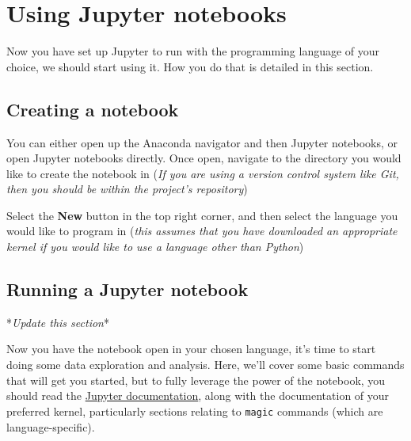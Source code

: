 \documentclass[]{book}
\begin{document}
\hypertarget{using-jupyter-notebooks}{%
\section{Using Jupyter notebooks}\label{using-jupyter-notebooks}}

Now you have set up Jupyter to run with the programming language of your choice, we should start using it. How you do that is detailed in this section.

\hypertarget{creating-a-notebook}{%
\subsection{Creating a notebook}\label{creating-a-notebook}}

You can either open up the Anaconda navigator and then Jupyter notebooks, or open Jupyter notebooks directly. Once open, navigate to the directory you would like to create the notebook in (\emph{If you are using a version control system like Git, then you should be within the project's repository})

Select the \textbf{New} button in the top right corner, and then select the language you would like to program in (\emph{this assumes that you have downloaded an appropriate kernel if you would like to use a language other than Python})

\hypertarget{running-a-jupyter-notebook}{%
\subsection{Running a Jupyter notebook}\label{running-a-jupyter-notebook}}

*\emph{Update this section}*

Now you have the notebook open in your chosen language, it's time to start doing some data exploration and analysis. Here, we'll cover some basic commands that will get you started, but to fully leverage the power of the notebook, you should read the \href{https://jupyter-notebook.readthedocs.io/en/stable/notebook.html\#code-cells}{Jupyter documentation}, along with the documentation of your preferred kernel, particularly sections relating to \texttt{magic} commands (which are language-specific).
\end{document}
